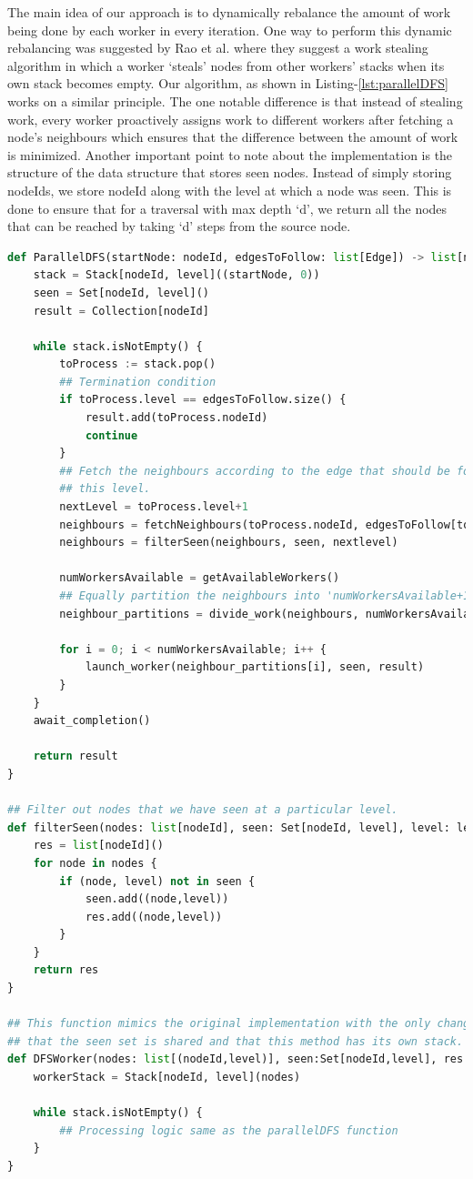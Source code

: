 \medskip
The main idea of our approach is to dynamically rebalance the amount of work
being done by each worker in every iteration. One way to perform this dynamic
rebalancing was suggested by Rao et al.\cite{rao1987parallel} where they suggest
a work stealing algorithm in which a worker `steals' nodes from other workers'
stacks when its own stack becomes empty. Our algorithm, as shown in 
Listing-\ref{lst:parallelDFS} works on a similar principle. The one notable
difference is that instead of stealing work, every worker proactively assigns
work to different workers after fetching a node's neighbours which ensures that
the difference between the amount of work is minimized. Another important point
to note about the implementation is the structure of the data structure that
stores seen nodes. Instead of simply storing nodeIds, we store nodeId along with
the level at which a node was seen. This is done to ensure that for a traversal
with max depth `d', we return all the nodes that can be reached by taking `d'
steps from the source node.
\begin{lstlisting}[caption={Parallel DFS}, label={lst:parallelDFS}, captionpos=b, language=Python]
def ParallelDFS(startNode: nodeId, edgesToFollow: list[Edge]) -> list[nodeId] {
    stack = Stack[nodeId, level]((startNode, 0))
    seen = Set[nodeId, level]()
    result = Collection[nodeId]

    while stack.isNotEmpty() {
        toProcess := stack.pop()
        ## Termination condition
        if toProcess.level == edgesToFollow.size() {
            result.add(toProcess.nodeId)
            continue
        }
        ## Fetch the neighbours according to the edge that should be followed at
        ## this level.
        nextLevel = toProcess.level+1
        neighbours = fetchNeighbours(toProcess.nodeId, edgesToFollow[toProcess.level])
        neighbours = filterSeen(neighbours, seen, nextlevel)

        numWorkersAvailable = getAvailableWorkers()
        ## Equally partition the neighbours into 'numWorkersAvailable+1' lists
        neighbour_partitions = divide_work(neighbours, numWorkersAvailable)

        for i = 0; i < numWorkersAvailable; i++ {
            launch_worker(neighbour_partitions[i], seen, result)
        }
    }
    await_completion()

    return result
}

## Filter out nodes that we have seen at a particular level.
def filterSeen(nodes: list[nodeId], seen: Set[nodeId, level], level: level) -> list[nodeId] {
    res = list[nodeId]()
    for node in nodes {
        if (node, level) not in seen {
            seen.add((node,level))
            res.add((node,level))
        }
    }
    return res
}

## This function mimics the original implementation with the only change being
## that the seen set is shared and that this method has its own stack.
def DFSWorker(nodes: list[(nodeId,level)], seen:Set[nodeId,level], res: list[nodeId]) {
    workerStack = Stack[nodeId, level](nodes)

    while stack.isNotEmpty() {
        ## Processing logic same as the parallelDFS function
    }
}
\end{lstlisting}

